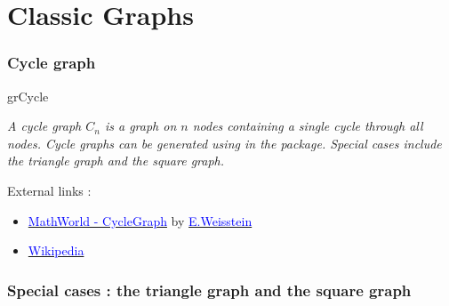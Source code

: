 \section{Classic Graphs}
\subsubsection{Cycle graph}
\begin{NewMacroBox}{grCycle}{}

\medskip
\emph{A cycle graph $C_n$ is a graph on $n$ nodes containing a single cycle through all nodes. Cycle graphs can be generated using  in   the  package. Special cases include  the triangle graph and  the square graph.}

\medskip
External links :

\medskip
\begin{itemize}

\item \href{http://mathworld.wolfram.com/CycleGraph.html}%
           {\textcolor{blue}{MathWorld - CycleGraph}} by %
      \href{http://en.wikipedia.org/wiki/Eric_W._Weisstein}%
           {\textcolor{blue}{E.Weisstein}}

\item  \href{http://en.wikipedia.org/wiki/Cycle_graph}%
            {\textcolor{blue}{Wikipedia}}

\end{itemize}
\end{NewMacroBox} 

\subsubsection{Special cases : the triangle graph and  the square graph}


\begin{center}
\begin{tkzexample}[small]
\end{tkzexample} 
\end{center}
 
